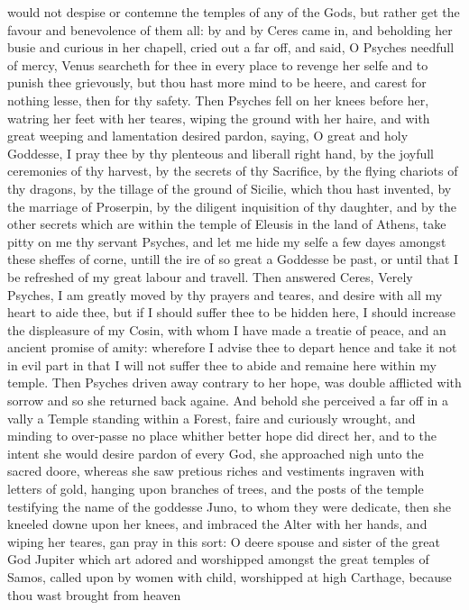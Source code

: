 would not despise or contemne the temples of any of the Gods, but rather get
the favour and benevolence of them all: by and by Ceres came in, and beholding
her busie and curious in her chapell, cried out a far off, and said, O Psyches
needfull of mercy, Venus searcheth for thee in every place to revenge her selfe
and to punish thee grievously, but thou hast more mind to be heere, and carest
for nothing lesse, then for thy safety. Then Psyches fell on her knees before
her, watring her feet with her teares, wiping the ground with her haire, and
with great weeping and lamentation desired pardon, saying, O great and holy
Goddesse, I pray thee by thy plenteous and liberall right hand, by the joyfull
ceremonies of thy harvest, by the secrets of thy Sacrifice, by the flying
chariots of thy dragons, by the tillage of the ground of Sicilie, which thou
hast invented, by the marriage of Proserpin, by the diligent inquisition of thy
daughter, and by the other secrets which are within the temple of Eleusis in
the land of Athens, take pitty on me thy servant Psyches, and let me hide my
selfe a few dayes amongst these sheffes of corne, untill the ire of so great a
Goddesse be past, or until that I be refreshed of my great labour and travell.
Then answered Ceres, Verely Psyches, I am greatly moved by thy prayers and
teares, and desire with all my heart to aide thee, but if I should suffer thee
to be hidden here, I should increase the displeasure of my Cosin, with whom I
have made a treatie of peace, and an ancient promise of amity: wherefore I
advise thee to depart hence and take it not in evil part in that I will not
suffer thee to abide and remaine here within my temple. Then Psyches driven
away contrary to her hope, was double afflicted with sorrow and so she returned
back againe. And behold she perceived a far off in a vally a Temple standing
within a Forest, faire and curiously wrought, and minding to over-passe no
place whither better hope did direct her, and to the intent she would desire
pardon of every God, she approached nigh unto the sacred doore, whereas she saw
pretious riches and vestiments ingraven with letters of gold, hanging upon
branches of trees, and the posts of the temple testifying the name of the
goddesse Juno, to whom they were dedicate, then she kneeled downe upon her
knees, and imbraced the Alter with her hands, and wiping her teares, gan pray
in this sort: O deere spouse and sister of the great God Jupiter which art
adored and worshipped amongst the great temples of Samos, called upon by women
with child, worshipped at high Carthage, because thou wast brought from heaven
